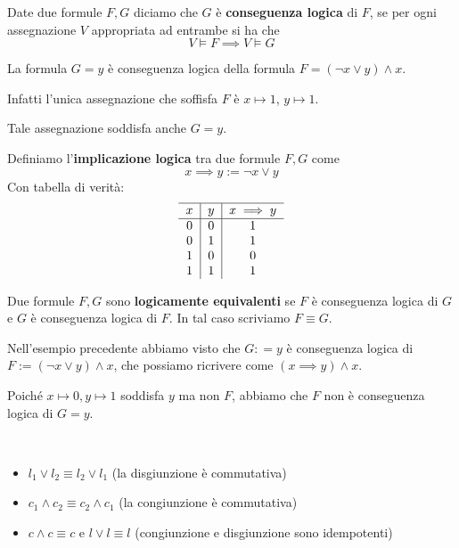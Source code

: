 \documentclass[../main.tex]{subfiles}
\begin{document}
\begin{definition}
    Date due formule $F,G$ diciamo che $G$ è \textbf{conseguenza logica} di $F$, se per ogni assegnazione $V$ appropriata ad entrambe si ha che
    \[
        \boxed{
            V \vDash F \implies V \vDash G
        }
    \]
\end{definition}
\begin{example}
    La formula $G = y$ è conseguenza logica della formula $F = (\neg x \lor y) \land x$.

    Infatti l'unica assegnazione che soffisfa $F$ è $x \mapsto 1$, $y \mapsto 1$.

    Tale assegnazione soddisfa anche $G = y$.
\end{example}
\begin{definition}
    Definiamo l'\textbf{implicazione logica} tra due formule $F,G$ come
    \[
        \boxed{
            x \implies y := \neg x \lor y
        }
    \]
    Con tabella di verità:
    \[
        \begin{tabular}{c|c|c}
            \hline
            $x$ & $y$ & $x \implies y$ \\
            \hline
            0   & 0   & 1              \\
            0   & 1   & 1              \\
            1   & 0   & 0              \\
            1   & 1   & 1              \\
        \end{tabular}
    \]
\end{definition}
\begin{definition}
    Due formule $F,G$ sono \textbf{logicamente equivalenti} se $F$ è conseguenza logica di $G$ e $G$ è conseguenza logica di $F$. In tal caso scriviamo $F \equiv G$.
\end{definition}
\begin{example}
    Nell'esempio precedente abbiamo visto che $G: = y$ è conseguenza logica di $F:= (\neg x \lor y) \land x $, che possiamo ricrivere come $(x \implies y) \land x$.

    Poiché $x \mapsto 0, y \mapsto 1$ soddisfa $y$ ma non $F$, abbiamo che $F$ non è conseguenza logica di $G = y$.
\end{example}
\begin{example}\
    \begin{itemize}
        \item $l_1 \lor l_2 \equiv l_2 \lor l_1$ (la disgiunzione è commutativa)
        \item $c_1 \land c_2 \equiv c_2 \land c_1$ (la congiunzione è commutativa)
        \item $c \land c \equiv c$ e $l \lor l \equiv l$ (congiunzione e disgiunzione sono idempotenti)
    \end{itemize}
\end{example}
\end{document}
